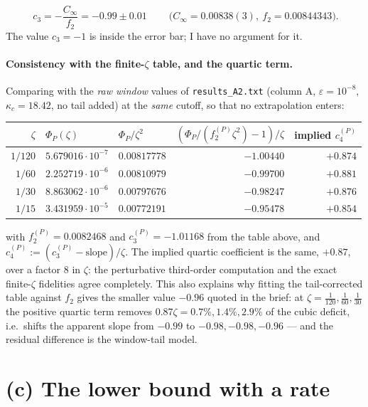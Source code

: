 \documentclass[11pt]{article}
\begin{document}
\begin{equation}\label{eq:c3}
 \boxed{\ c_3=-\frac{C_\infty}{f_2}=-0.99\pm0.01\ }\qquad
 \bigl(C_\infty=0.00838(3),\ f_2=0.00844343\bigr).
\end{equation}
The value $c_3=-1$ is inside the error bar; I have no argument for it.

\paragraph{Consistency with the finite-$\zeta$ table, and the quartic term.}  Comparing with the
\emph{raw window} values of \texttt{results\_A2.txt} (column A, $\varepsilon=10^{-8}$,
$\kappa_c=18.42$, no tail added) at the \emph{same} cutoff, so that no extrapolation enters:
\begin{center}\small
\begin{tabular}{r l l r r}\toprule
$\zeta$ & $\Phi_P(\zeta)$ & $\Phi_P/\zeta^2$ & $(\Phi_P/(f_2^{(P)}\zeta^2)-1)/\zeta$ &
implied $c_4^{(P)}$\\\midrule
$1/120$ & $5.679016\cdot10^{-7}$ & $0.00817778$ & $-1.00440$ & $+0.874$\\
$1/60$ & $2.252719\cdot10^{-6}$ & $0.00810979$ & $-0.99700$ & $+0.881$\\
$1/30$ & $8.863062\cdot10^{-6}$ & $0.00797676$ & $-0.98247$ & $+0.876$\\
$1/15$ & $3.431959\cdot10^{-5}$ & $0.00772191$ & $-0.95478$ & $+0.854$\\
\bottomrule\end{tabular}\end{center}
with $f_2^{(P)}=0.0082468$ and $c_3^{(P)}=-1.01168$ from the table above, and
$c_4^{(P)}:=(c_3^{(P)}-\text{slope})/\zeta$.  The implied quartic coefficient is the same,
$+0.87$, over a factor $8$ in $\zeta$: the perturbative third-order computation and the exact
finite-$\zeta$ fidelities agree completely.  This also explains why fitting the tail-corrected
table against $f_2$ gives the smaller value $-0.96$ quoted in the brief: at
$\zeta=\frac1{120},\frac1{60},\frac1{30}$ the positive quartic term removes
$0.87\zeta=0.7\%,1.4\%,2.9\%$ of the cubic deficit, i.e.\ shifts the apparent slope from $-0.99$
to $-0.98,-0.98,-0.96$ --- and the residual difference is the window-tail model.

\section{(c) The lower bound with a rate}\label{sec:c}
\end{document}
